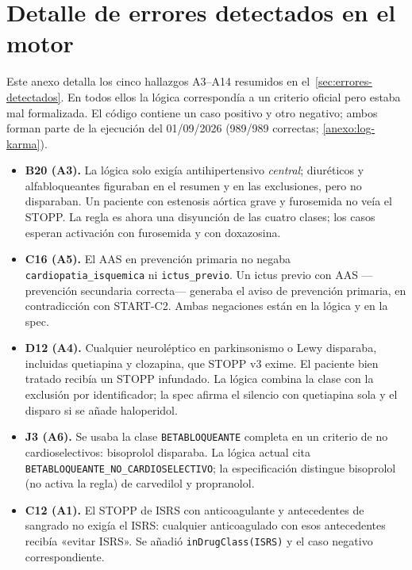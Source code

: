\chapter{Detalle de errores detectados en el motor}
\label{anexo:errores-motor}

Este anexo detalla los cinco hallazgos A3--A14 resumidos en
el~\cref{sec:errores-detectados}. En todos ellos la lógica correspondía a
un criterio oficial pero estaba mal formalizada. El código contiene un caso
positivo y otro negativo; ambos forman parte de la ejecución del
01/09/2026 (989/989 correctas; \cref{anexo:log-karma}).

\begin{itemize}[leftmargin=1.4em,itemsep=0.25em]
  \item \textbf{B20 (A3).} La lógica solo exigía antihipertensivo
  \emph{central}; diuréticos y alfabloqueantes figuraban en el resumen y
  en las exclusiones, pero no disparaban. Un paciente con estenosis
  aórtica grave y furosemida no veía el STOPP. La regla es ahora una
  disyunción de las cuatro clases; los casos esperan activación con
  furosemida y con doxazosina.
  \item \textbf{C16 (A5).} El AAS en prevención primaria no negaba
  \texttt{cardiopatia\_isquemica} ni \texttt{ictus\_previo}. Un ictus
  previo con AAS ---prevención secundaria correcta--- generaba el aviso
  de prevención primaria, en contradicción con START-C2. Ambas
  negaciones están en la lógica y en la spec.
  \item \textbf{D12 (A4).} Cualquier neuroléptico en parkinsonismo o
  Lewy disparaba, incluidas quetiapina y clozapina, que STOPP v3 exime.
  El paciente bien tratado recibía un STOPP infundado. La lógica combina
  la clase con la exclusión por identificador; la spec afirma el silencio
  con quetiapina sola y el disparo si se añade haloperidol.
  \item \textbf{J3 (A6).} Se usaba la clase \texttt{BETABLOQUEANTE}
  completa en un criterio de no cardioselectivos: bisoprolol disparaba.
  La lógica actual cita \texttt{BETABLOQUEANTE\_NO\_CARDIOSELECTIVO}; la
  especificación distingue bisoprolol (no activa la regla) de carvedilol y
  propranolol.
  \item \textbf{C12 (A1).} El STOPP de ISRS con anticoagulante y
  antecedentes de sangrado no exigía el ISRS: cualquier anticoagulado
  con esos antecedentes recibía «evitar ISRS». Se añadió
  \texttt{inDrugClass(ISRS)} y el caso negativo correspondiente.
\end{itemize}

